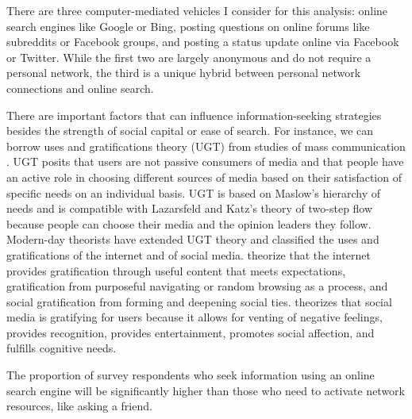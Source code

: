 There are three computer-mediated vehicles I consider for this analysis: online
search engines like Google or Bing, posting questions on online forums like
subreddits or Facebook groups, and posting a status update online via Facebook
or Twitter. While the first two are largely anonymous and do not require a
personal network, the third is a unique hybrid between personal network
connections and online search.

There are important factors that can influence information-seeking strategies
besides the strength of social capital or ease of search. For instance, we can
borrow uses and gratifications theory (UGT) from studies of mass communication
\citep{blumlerUsesMassCommunications1974, tanMassCommunicationTheories1985}. 
UGT posits that users are not passive consumers of media and that people have an
active role in choosing different sources of media based on their satisfaction
of specific needs on an individual basis. UGT is based on Maslow’s  
\citeyear{maslowTheoryHumanMotivation1943} hierarchy of needs and is compatible with
Lazarsfeld and Katz’s theory of two-step flow \cite{katzPersonalInfluencePart1955}
because people can choose their media and the opinion leaders they follow.
Modern-day theorists have extended UGT theory and classified the uses and
gratifications of the internet and of social media. 
\citet{staffordDeterminingUsesGratifications2004} theorize that the internet
provides gratification through useful content that meets expectations,
gratification from purposeful navigating or random browsing as a process, and
social gratification from forming and deepening social ties. 
\citet{leungGenerationalDifferencesContent2013} theorizes that social media is
gratifying for users because it allows for venting of negative feelings,
provides recognition, provides entertainment, promotes social affection, and
fulfills cognitive needs. 

\begin{hyp} \label{hyp:online-vs-network}
The proportion of survey respondents who seek information
using an online search engine will be significantly higher than those who
need to activate network resources, like asking a friend.
\end{hyp}


